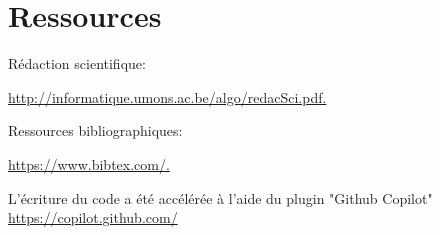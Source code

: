 \documentclass{article}
\begin{document}
    \newpage



    \section{Ressources}
    Rédaction scientifique:

    \href{http://informatique.umons.ac.be/algo/redacSci.pdf.}{http://informatique.umons.ac.be/algo/redacSci.pdf.
    }

    Ressources bibliographiques:

    \href{https://www.bibtex.com/.}{https://www.bibtex.com/.}

    L'écriture du code a été accélérée à l'aide du plugin "Github Copilot"
    \href{https://copilot.github.com/}{https://copilot.github.com/}
\end{document}
